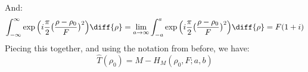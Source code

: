 \documentclass[crop=false,class=book,oneside]{standalone}
\begin{document}
                And:
                \begin{equation*}
                    \int_{-\infty}^{\infty}
                    \exp\Big(i\frac{\pi}{2}
                        \big(\frac{\rho-\rho_0}{F}\big)^{2}\Big)
                    \diff{\rho}
                    =\underset{a\rightarrow \infty}{\lim}
                    \int_{-a}^{a}
                    \exp\Big(i\frac{\pi}{2}
                        \big(\frac{\rho-\rho_0}{F}\big)^{2}\Big)
                    \diff{\rho}
                    =F(1+i)
                \end{equation*}
                Piecing this together, and using the notation from before,
                we have:
                \begin{equation*}
                \hat{T}(\rho_0)=M-H_{M}(\rho_0,F;a,b)
                \end{equation*}
\end{document}
